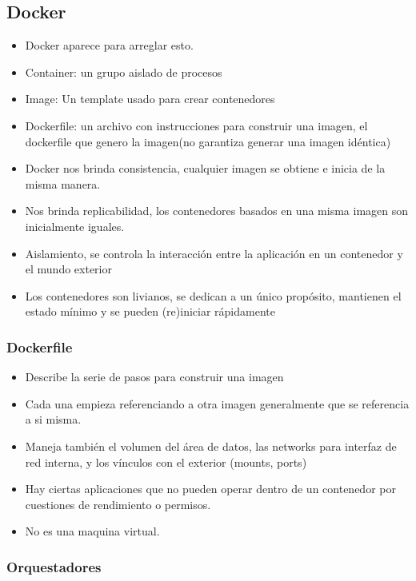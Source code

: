 \subsection*{Docker}
\begin{itemize}
\item Docker aparece para arreglar esto.
\item Container: un grupo aislado de procesos
\item Image: Un template usado para crear contenedores
\item Dockerfile: un archivo con instrucciones para construir una imagen, el dockerfile que genero la imagen(no garantiza generar una imagen idéntica)
\item Docker nos brinda consistencia, cualquier imagen se obtiene e inicia de la misma manera.
\item Nos brinda replicabilidad, los contenedores basados en una misma imagen son inicialmente iguales.
\item Aislamiento, se controla la interacción entre la aplicación en un contenedor y el mundo exterior
\item Los contenedores son livianos, se dedican a un único propósito, mantienen el estado mínimo y se pueden (re)iniciar rápidamente
\end{itemize}



\subsubsection*{Dockerfile}
\begin{itemize}
\item Describe la serie de pasos para construir una imagen
\item Cada una empieza referenciando a otra imagen generalmente que se referencia a si misma.
\item Maneja también el volumen del área de datos, las networks para interfaz de red interna, y los vínculos con el exterior (mounts, ports)
\item Hay ciertas aplicaciones que no pueden operar dentro de un contenedor por cuestiones de rendimiento o permisos.
\item No es una maquina virtual.
\end{itemize}


\subsubsection*{Orquestadores}

